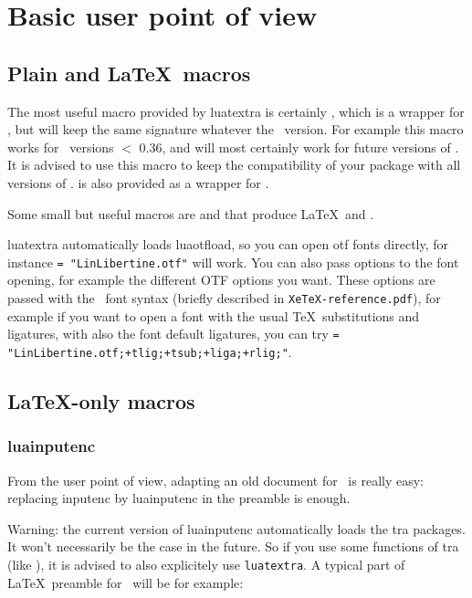 \documentclass{article}
\makeatletter
\newlength\xxt@kern@Te
\newlength\xxt@kern@eX
\newlength\xxt@lower@e
\DeclareRobustCommand\XeTeX{%
  \leavevmode
  \smash{%
   X\lower\xxt@lower@e
   \hbox{\kern\xxt@kern@eX
   \setbox0=\hbox{E}\dimen0=\ht0\advance\dimen0by\dp0%
   \raise\dimen0\hbox{\rotatebox{180}{\box0}}%
   }\kern\xxt@kern@Te\TeX}}%
\makeatother
\begin{document}
\section{Basic user point of view}

\subsection{Plain and \LaTeX\ macros}

The most useful macro provided by \textsf{luatextra} is certainly
\texttt{\string\luadirect}, which is a wrapper for \texttt{\string\directlua},
but will keep the same signature whatever the \LuaTeX\ version. For example
this macro works for \LuaTeX\ versions $<$ 0.36, and will most certainly work
for future versions of \LuaTeX . It is advised to use this macro to keep the
compatibility of your package with all versions of \LuaTeX .
\texttt{\string\lualate} is also provided as a wrapper for
\texttt{\string\latelua}.

Some small but useful macros are \texttt{\string\LuaTeX} and
\texttt{\string\LuaLaTeX} that produce \LaTeX\ and \LuaLaTeX .

\textsf{luatextra} automatically loads \textsf{luaotfload}, so you can open
otf fonts directly, for instance \texttt{\string\font\string\foo =
  "LinLibertine.otf"\string\foo} will work. You can also pass options to the
font opening, for example the different OTF options you want. These options
are passed with the \XeTeX\ font syntax (briefly described in
\texttt{XeTeX-reference.pdf}), for example if you want to open a font with the
usual \TeX\ substitutions and ligatures, with also the font default ligatures,
you can try \newline \texttt{\string\font\string\foo =
  "LinLibertine.otf;+tlig;+tsub;+liga;+rlig;"\string\foo}.

\subsection{\LaTeX -only macros}

\subsubsection{luainputenc}

From the user point of view, adapting an old document for \LuaTeX\ is really
easy: replacing \textsf{inputenc} by \textsf{luainputenc} in the preamble is
enough.

\textsf{Warning:} the current version of \textsf{luainputenc} automatically
loads the \LuaTeX tra packages. It won't necessarily be the case in the
future. So if you use some functions of \LuaTeX tra (like
\texttt{\string\newluaattribute}), it is advised to also explicitely use
\texttt{luatextra}. A typical part of \LaTeX\ preamble for \LuaTeX\ will be
for example:
\end{document}
